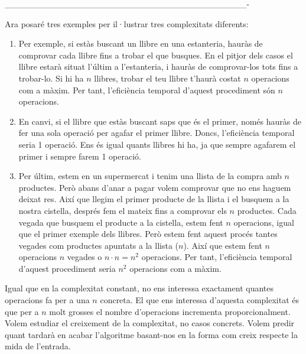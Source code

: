 _______________________________________-

Ara posaré tres exemples per il·lustrar tres complexitats diferents: 
\begin{enumerate}
    \item Per exemple, si estàs buscant un llibre en una estanteria, hauràs de comprovar cada llibre fins a trobar el que busques. En el pitjor dels casos el llibre estarà situat l'últim a l'estanteria, i hauràs de comprovar-los tots fins a trobar-lo. Si hi ha $n$ llibres, trobar el teu llibre t'haurà costat $n$ operacions com a màxim. Per tant, l'eficiència temporal d'aquest procediment són $n$ operacions. \newline
    
    \item En canvi, si el llibre que estàs buscant saps que és el primer, només hauràs de fer una sola operació per agafar el primer llibre. Doncs, l'eficiència temporal seria 1 operació. Ens és igual quants llibres hi ha, ja que sempre agafarem el primer i sempre farem 1 operació. \newline
    
    \item Per últim, estem en un supermercat i tenim una llista de la compra amb $n$ productes. Però abans d'anar a pagar volem comprovar que no ens haguem deixat res. Així que llegim el primer producte de la llista i el busquem a la nostra cistella, després fem el mateix fins a comprovar els $n$ productes. Cada vegada que busquem el producte a la cistella, estem fent $n$ operacions, igual que el primer exemple dels llibres. Però estem fent aquest procés tantes vegades com productes apuntats a la llista ($n$). Així que estem fent $n$ operacions $n$ vegades o $n \cdot n = n^2$ operacions. Per tant, l'eficiència temporal d'aquest procediment seria $n^2$ operacions com a màxim.
\end{enumerate}

Igual que en la complexitat constant, no ens interessa exactament quantes operacions fa per a una $n$ concreta. El que ens interessa d'aquesta complexitat és que per a $n$ molt grosses el nombre d'operacions incrementa proporcionalment. Volem estudiar el creixement de la complexitat, no casos concrets. Volem predir quant tardarà en acabar l'algoritme basant-nos en la forma com creix respecte la mida de l'entrada. 

